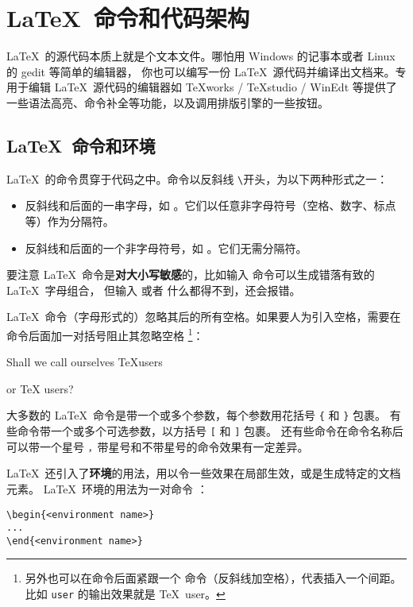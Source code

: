 \section{\LaTeX\ 命令和代码架构}\label{sec:src}

\LaTeX\ 的源代码本质上就是个文本文件。哪怕用 Windows 的记事本或者 Linux 的 gedit 等简单的编辑器，
你也可以编写一份 \LaTeX\ 源代码并编译出文档来。专用于编辑 \LaTeX\ 源代码的编辑器如
TeXworks / TeXstudio / WinEdt 等提供了一些语法高亮、命令补全等功能，以及调用排版引擎的一些按钮。

\subsection{\LaTeX\ 命令和环境}\label{subsec:cmds}

\LaTeX\ 的命令贯穿于代码之中。命令以反斜线 \texttt\textbackslash 开头，为以下两种形式之一：
\begin{itemize}
  \item 反斜线和后面的一串字母，如 。它们以任意非字母符号（空格、数字、标点等）作为分隔符。
  \item 反斜线和后面的一个非字母符号，如 \cmd{\$}。它们无需分隔符。
\end{itemize}

要注意 \LaTeX\ 命令是\textbf{对大小写敏感}的，比如输入  命令可以生成错落有致的 \LaTeX\ 字母组合，
但输入  或者  什么都得不到，还会报错。

\LaTeX\ 命令（字母形式的）忽略其后的所有空格。如果要人为引入空格，需要在命令后面加一对括号阻止其忽略空格%
\footnote{另外也可以在命令后面紧跟一个 \cmd{\textvisiblespace} 命令（反斜线加空格），代表插入一个间距。\\
比如 \cmd{\textvisiblespace}\-\texttt{user} 的输出效果就是 \TeX\ user。}：
\begin{example}
Shall we call ourselves 
\TeX users 

or \TeX{} users?
\end{example}

大多数的 \LaTeX\ 命令是带一个或多个参数，每个参数用花括号 \texttt\{ 和 \texttt\} 包裹。
有些命令带一个或多个可选参数，以方括号 \texttt[ 和 \texttt] 包裹。
还有些命令在命令名称后可以带一个星号 \texttt*，带星号和不带星号的命令效果有一定差异。

\LaTeX\ 还引入了\textbf{环境}的用法，用以令一些效果在局部生效，或是生成特定的文档元素。
\LaTeX\ 环境的用法为一对命令  ：
\begin{verbatim}
\begin{<environment name>}
...
\end{<environment name>}
\end{verbatim}

